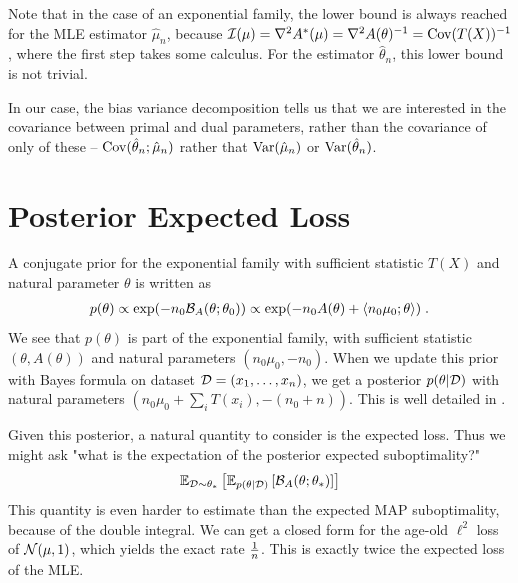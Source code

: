 \documentclass{article}
\newcommand*{\expect}[2][]{\ensuremath{\mathbb{E}_{#1} \left[ #2 \right] }} %
\newcommand{\logpart}{A}
\newcommand{\conj}{\logpart^*}
\newcommand{\bregman}{\cB_\logpart}
\newcommand{\natp}{\theta}
\newcommand{\MAPm}{\hat \mu_n}
\newcommand{\MAPt}{\hat \natp_n}
\begin{document}
Note that in the case of an exponential family, the lower bound is always reached for the MLE estimator $\hat \mu_n$, because $\cI(\mu) = \nabla^2 \conj(\mu) = \nabla^2 \logpart(\natp)^{-1} = \Cov(T(X))^{-1}$, where the first step takes some calculus. For the estimator $\hat \natp_n$, this lower bound is not trivial.

In our case, the bias variance decomposition tells us that we are interested in the covariance between primal and dual parameters, rather than the covariance of only of these -- $\Cov(\MAPt;\MAPm)$ rather that $\Var(\MAPm)$ or $\Var(\MAPt)$.

\section{Posterior Expected Loss}

A conjugate prior for the exponential family with sufficient statistic $T(X)$ and natural parameter $\natp$ is written as
\begin{align}
    p(\natp) 
    \propto \exp(-n_0 \bregman(\natp ; \natp_0)) 
    \propto \exp(-n_0 \logpart(\natp) + \langle n_0 \mu_0 ; \natp \rangle) \; .
\end{align}
We see that $p(\natp)$ is part of the exponential family, with sufficient statistic $(\natp, \logpart(\natp))$ and natural parameters $(n_0 \mu_0 , -n_0)$. When we update this prior with Bayes formula on dataset ${\mathcal D}=(x_1,\dots,x_n)$, we get a posterior $p(\natp | \cD)$ with natural parameters $(n_0 \mu_0 + \sum_i T(x_i) , -(n_0 + n))$. This is well detailed in \citet{agarwal2010geometric}. 

Given this posterior, a natural quantity to consider is the expected loss. Thus we might ask "what is the expectation of the posterior expected suboptimality?"
\begin{align}
    \expect[\cD\sim\natp_*]{\expect[p(\natp|\cD)]{\bregman(\natp ; \natp_*)}}
\end{align}
This quantity is even harder to estimate than the expected MAP suboptimality, because of the double integral. We can get a closed form for the age-old $\ell^2$ loss of ${\mathcal N}(\mu, 1)$, which yields the exact rate $\frac{1}{n}$. This is exactly twice the expected loss of the MLE.
\end{document}
